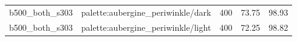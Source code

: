 \begin{longtable}{l>{\raggedright\arraybackslash}p{.42\linewidth}rrr}
b500\_\allowbreak{}both\_\allowbreak{}s303 & %
palette:aubergine\_\allowbreak{}periwinkle/dark & %
400 & %
73.75 & %
98.93 \\ %

b500\_\allowbreak{}both\_\allowbreak{}s303 & %
palette:aubergine\_\allowbreak{}periwinkle/light & %
400 & %
72.25 & %
98.82 \\ %


\end{longtable}
